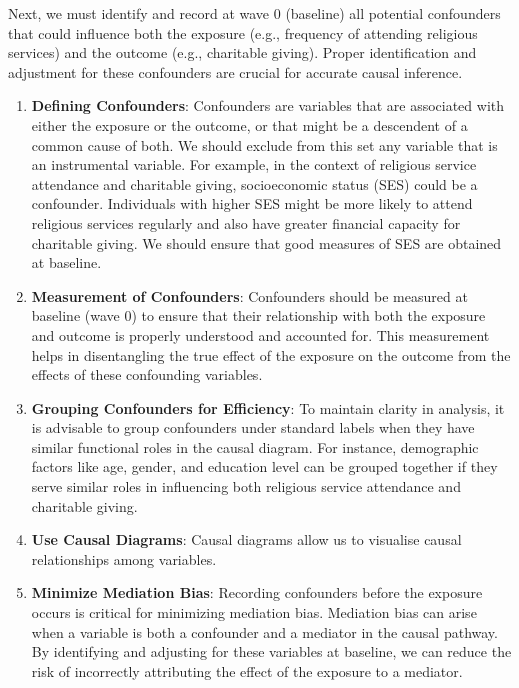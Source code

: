 \documentclass[
  singlecolumn,
  9pt]{article}
\begin{document}
Next, we must identify and record at wave 0 (baseline) all potential
confounders that could influence both the exposure (e.g., frequency of
attending religious services) and the outcome (e.g., charitable giving).
Proper identification and adjustment for these confounders are crucial
for accurate causal inference.

\begin{enumerate}
\def\labelenumi{\arabic{enumi}.}
\item
  \textbf{Defining Confounders}: Confounders are variables that are
  associated with either the exposure or the outcome, or that might be a
  descendent of a common cause of both. We should exclude from this set
  any variable that is an instrumental variable. For example, in the
  context of religious service attendance and charitable giving,
  socioeconomic status (SES) could be a confounder. Individuals with
  higher SES might be more likely to attend religious services regularly
  and also have greater financial capacity for charitable giving. We
  should ensure that good measures of SES are obtained at baseline.
\item
  \textbf{Measurement of Confounders}: Confounders should be measured at
  baseline (wave 0) to ensure that their relationship with both the
  exposure and outcome is properly understood and accounted for. This
  measurement helps in disentangling the true effect of the exposure on
  the outcome from the effects of these confounding variables.
\item
  \textbf{Grouping Confounders for Efficiency}: To maintain clarity in
  analysis, it is advisable to group confounders under standard labels
  when they have similar functional roles in the causal diagram. For
  instance, demographic factors like age, gender, and education level
  can be grouped together if they serve similar roles in influencing
  both religious service attendance and charitable giving.
\item
  \textbf{Use Causal Diagrams}: Causal diagrams allow us to visualise
  causal relationships among variables.
\item
  \textbf{Minimize Mediation Bias}: Recording confounders before the
  exposure occurs is critical for minimizing mediation bias. Mediation
  bias can arise when a variable is both a confounder and a mediator in
  the causal pathway. By identifying and adjusting for these variables
  at baseline, we can reduce the risk of incorrectly attributing the
  effect of the exposure to a mediator.
\end{enumerate}
\end{document}
